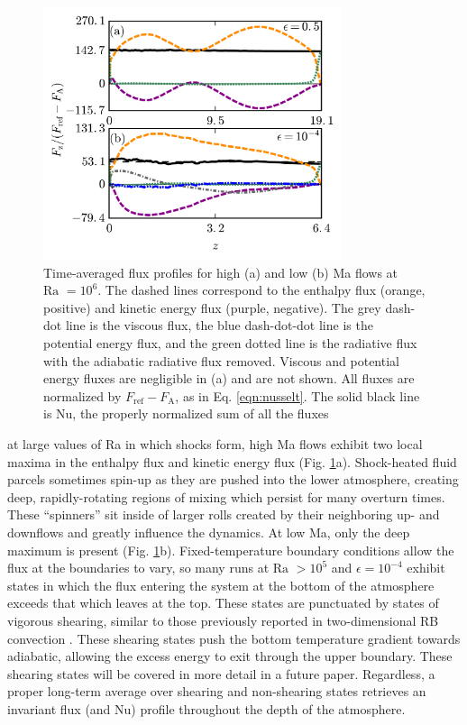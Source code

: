 \documentclass[aps, prl, twocolumn, nofootinbib, groupedaddress, amsfonts, amssymb, amsmath]{revtex4-1}
\begin{document}
\begin{figure}[t]
\includegraphics[width=3.4375in]{./figs/fluxes_fig.png}
\caption{Time-averaged flux profiles for high (a) and low (b) Ma flows at $\text{Ra }= 10^6$.  
The dashed lines correspond to the
enthalpy flux (orange, positive) and kinetic energy flux (purple, negative).  The grey dash-dot line is the
viscous flux, the blue dash-dot-dot line is the potential energy flux, 
and the green dotted line is the radiative flux with the adiabatic radiative flux removed. Viscous and
potential energy fluxes are negligible in (a) and are not shown.  All
fluxes are normalized by $F_{\text{ref}} - F_{\text{A}}$, as in Eq. \ref{eqn:nusselt}.  The solid black line is
Nu, the properly normalized sum of all the fluxes \label{fig:flux_profiles} }
\end{figure}

at large values of Ra in which shocks form, high Ma flows exhibit two 
local maxima in the enthalpy flux and kinetic energy flux (Fig. \ref{fig:flux_profiles}a).
Shock-heated fluid parcels sometimes spin-up as they are pushed into the lower atmosphere, creating deep,
rapidly-rotating regions
of mixing which persist for many overturn times.  These ``spinners'' sit inside of larger rolls created by their
neighboring up- and downflows and greatly influence the dynamics.
At low Ma, only the deep maximum is present (Fig. \ref{fig:flux_profiles}b).  
Fixed-temperature boundary conditions allow the flux at the boundaries to vary, so many runs at $\text{Ra }> 10^5$
and $\epsilon = 10^{-4}$ exhibit states in which the flux entering the system at the bottom of the atmosphere 
exceeds that which leaves at the top.  
These states are punctuated by states of vigorous shearing, similar to those previously
reported in two-dimensional RB convection \cite{goluskin&all2014}.  
These shearing states push the bottom temperature
gradient towards adiabatic, allowing the excess energy to exit through the upper boundary.  These shearing
states will be covered in more detail in a future paper.  Regardless, a proper long-term average over shearing
and non-shearing states retrieves an invariant flux (and Nu) profile throughout the depth
of the atmosphere. 
\end{document}
